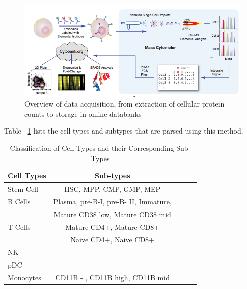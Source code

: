 \documentclass{article}
\begin{document}
\begin{figure}[ht]
\vskip 0.2in
\begin{center}
\centerline{\includegraphics[width=\columnwidth]{DataAcquisition}}
\caption{Overview of data acquisition, from extraction of cellular protein counts to storage in online databanks}
\end{center}
\label{dataacquisition}
\vskip -0.2in
\end{figure} 

Table ~\ref{table_cell_type} lists the cell types and subtypes that are parsed using this method. 

\begin{table}[tb]
\caption{Classification of Cell Types and their Corresponding Sub-Types}
\label{table_cell_type}
\vskip 0.15in
\begin{center}
\begin{small}
\begin{sc}
\begin{tabular}{lcccr}
\hline
\abovespace\belowspace
Cell Types & Sub-types  \\
\hline
\abovespace
Stem Cell	&  HSC, MPP, CMP, GMP, MEP \\
B Cells 	& Plasma, pre-B-I, pre-B- II, Immature, \\ 
		&			Mature CD38 low, Mature CD38 mid\\
T Cells	& Mature CD4+, Mature CD8+ \\
		& Naive CD4+, Naive CD8+  \\
NK		& -   \\
pDC		& - \\
\belowspace
Monocytes & CD11B - , CD11B high, CD11B mid \\
\hline
\end{tabular}
\end{sc}
\end{small}
\end{center}
\vskip -0.1in
\end{table}
\end{document}
